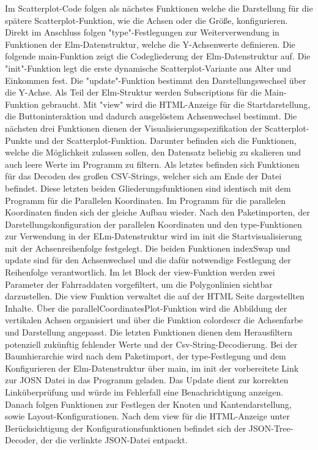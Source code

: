\documentclass[usegeometry=true]{scrartcl}
\begin{document}
Im Scatterplot-Code folgen als nächstes Funktionen welche die Darstellung für die spätere Scatterplot-Funktion, wie die Achsen oder die Größe, konfigurieren. Direkt im Anschluss folgen "type"-Festlegungen zur Weiterverwendung in Funktionen der Elm-Datenstruktur, welche die Y-Achsenwerte definieren. Die folgende main-Funktion zeigt die Codegliederung der Elm-Datenstruktur auf.
Die "init"-Funktion legt die erste dynamische Scatterplot-Variante aus Alter und Einkommen fest. Die "update"-Funktion bestimmt den Darstellungswechsel über die Y-Achse. Als Teil der Elm-Struktur werden Subscriptions für die Main-Funktion gebraucht. Mit "view" wird die HTML-Anzeige für die Startdarstellung, die Buttoninteraktion und dadurch ausgelöstem Achsenwechsel bestimmt. Die nächsten drei Funktionen dienen der Visualisierungsspezifikation der Scatterplot-Punkte und der Scatterplot-Funktion.
Darunter befinden sich die Funktionen, welche die Möglichkeit zulassen sollen, den Datensatz beliebig zu skalieren und auch leere Werte im Programm zu filtern. Als letztes befinden sich Funktionen für das Decoden des großen CSV-Strings, welcher sich am Ende der Datei befindet. Diese letzten beiden Gliederungsfunktionen sind identisch mit dem Programm für die Parallelen Koordinaten. 
\newline Im Programm für die parallelen Koordinaten finden sich der gleiche Aufbau wieder. Nach den Paketimporten, der Darstellungskonfiguration der parallelen Koordinaten und den type-Funktionen zur Verwendung in der ELm-Datenstruktur wird im init die Startvisualisierung mit der Achsenreihenfolge festgelegt. Die beiden Funktionen indexSwap und update sind für den Achsenwechsel und die dafür notwendige Festlegung der Reihenfolge verantwortlich. 
Im let Block der view-Funktion werden zwei Parameter der Fahrraddaten vorgefiltert, um die Polygonlinien sichtbar darzustellen. Die view Funktion verwaltet die auf der HTML Seite dargestellten Inhalte. Über die parallelCoordinatesPlot-Funktion wird die Abbildung der vertikalen Achsen organisiert und über die Funktion colordescr die Achsenfarbe und Darstellung angepasst. Die letzten Funktionen dienen dem Herausfiltern potenziell zukünftig fehlender Werte und der Csv-String-Decodierung. 
\newline Bei der Baumhierarchie wird nach dem Paketimport, der type-Festlegung und dem Konfigurieren der Elm-Datenstruktur über main, im init der vorbereitete Link zur JOSN Datei in das Programm geladen. Das Update dient zur korrekten Linküberprüfung und würde im Fehlerfall eine Benachrichtigung anzeigen. Danach folgen Funktionen zur Festlegen der Knoten und Kantendarstellung, sowie Layout-Konfigurationen. Nach dem view für die HTML-Anzeige unter Berücksichtigung der Konfigurationsfunktionen befindet sich der JSON-Tree-Decoder, der die verlinkte JSON-Datei entpackt. 
\end{document}
